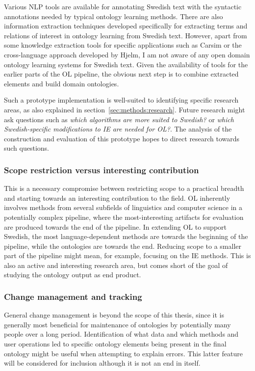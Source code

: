 \documentclass[a4paper]{report}
\begin{document}
Various NLP tools are available for annotating Swedish text with the syntactic annotations needed by typical ontology learning methods.
There are also information extraction techniques developed specifically for extracting terms and relations of interest in ontology learning\cite{Kokkinakis08SolidComp} from Swedish text.
However, apart from some knowledge extraction tools for specific applications such as Carsim\cite{JohanssonEtAll04Carsim} or the cross-language approach developed by Hjelm\cite{Hjelm09Thesis}, I am not aware of any open domain ontology learning systems for Swedish text.
Given the availability of tools for the earlier parts of the OL pipeline, the obvious next step is to combine extracted elements and build domain ontologies.

Such a prototype implementation is well-suited to identifying specific research areas, as also explained in section~\ref{sec:methods:research}.
Future research might ask questions such as \emph{which algorithms are more suited to Swedish?} or \emph{which Swedish-specific modifications to IE are needed for OL?}.
The analysis of the construction and evaluation of this prototype hopes to direct research towards such questions.

\subsubsection{Scope restriction versus interesting contribution}

This is a necessary compromise between restricting scope to a practical breadth and starting towards an interesting contribution to the field.
OL inherently involves methods from several subfields of linguistics and computer science in a potentially complex pipeline, where the most-interesting artifacts for evaluation are produced towards the end of the pipeline.
In extending OL to support Swedish, the most language-dependent methods are towards the beginning of the pipeline, while the ontologies are towards the end.
Reducing scope to a smaller part of the pipeline might mean, for example, focusing on the IE methods.
This is also an active and interesting research area, but comes short of the goal of studying the ontology output as end product.

\subsubsection{Change management and tracking}

General change management is beyond the scope of this thesis, since it is generally most beneficial for maintenance of ontologies by potentially many people over a long period.
Identification of what data and which methods and user operations led to specific ontology elements being present in the final ontology might be useful when attempting to explain errors.
This latter feature will be considered for inclusion although it is not an end in itself.
\end{document}
